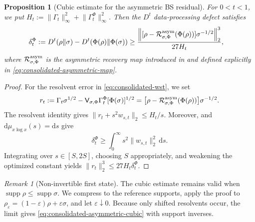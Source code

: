 \documentclass[11pt]{article}
\newtheorem{proposition}[proposition]{Proposition}
\theoremstyle{remark}
\newtheorem{remark}[remark]{Remark}
\newcommand{\1}{\mathbbm{1}}
\begin{document}
\begin{proposition}[Cubic estimate for the asymmetric BS residual]
\label{prop:consolidated-asymmetric-cubic}
For $0<t<1$, we put
$H_t:=\lVert\Gamma_t\rVert_\infty^2+
\lVert\Gamma_t^\Phi\rVert_\infty^2$.
Then the $D^t$ data-processing defect satisfies
\begin{equation}
 \begin{aligned}
 \delta_t^\Phi
 &:=D^t(\rho\Vert\sigma)
   -D^t\!\left(\Phi(\rho)\Vert\Phi(\sigma)\right)
\geq
 \frac{\left\lVert
 [\rho-\mathcal R_{\sigma,\Phi}^{\rm asym}(\Phi(\rho))]
 \sigma^{-1/2}\right\rVert_2^3}
 {27H_t},
 \end{aligned}
 \label{eq:consolidated-asymmetric-cubic}
\end{equation}
where $\mathcal R_{\sigma,\Phi}^{\rm asym}$ is the asymmetric recovery
map introduced in  and
defined explicitly in \eqref{eq:consolidated-asymmetric-map}.
\end{proposition}

\begin{proof}
For the resolvent error in \eqref{eq:consolidated-wst}, we set
\begin{equation}
 r_t:=\Gamma_t\sigma^{1/2}
 -\mathsf V_{\sigma,\Phi}\Gamma_t^\Phi[\Phi(\sigma)]^{1/2}
 =\bigl[\rho-
 \mathcal R_{\sigma,\Phi}^{\rm asym}(\Phi(\rho))\bigr]
 \sigma^{-1/2}.
\end{equation}
The resolvent identity gives
$\lVert r_t+s^2w_{s,t}\rVert_2\leq H_t/s$.
Moreover,  and
$\mathrm d\mu_{x\log x}(s)=\mathrm ds$ give
\begin{equation}
 \delta_t^\Phi\geq
 \int_0^\infty s^2\lVert w_{s,t}\rVert_2^2\,\mathrm ds.
\end{equation}
Integrating over $s\in[S,2S]$, choosing $S$ appropriately, and
weakening the optimized constant yields
$\lVert r_t\rVert_2^3\leq27H_t\delta_t^\Phi$.
\end{proof}

\begin{remark}[Non-invertible first state]
The cubic estimate remains valid when
$\operatorname{supp}\rho\leq\operatorname{supp}\sigma$.  We
compress to the reference supports, apply the proof to
$\rho_\varepsilon=(1-\varepsilon)\rho+\varepsilon\sigma$, and let
$\varepsilon\downarrow0$.  Because only shifted resolvents occur,
the limit gives \eqref{eq:consolidated-asymmetric-cubic} with support
inverses.
\end{remark}
\end{document}
